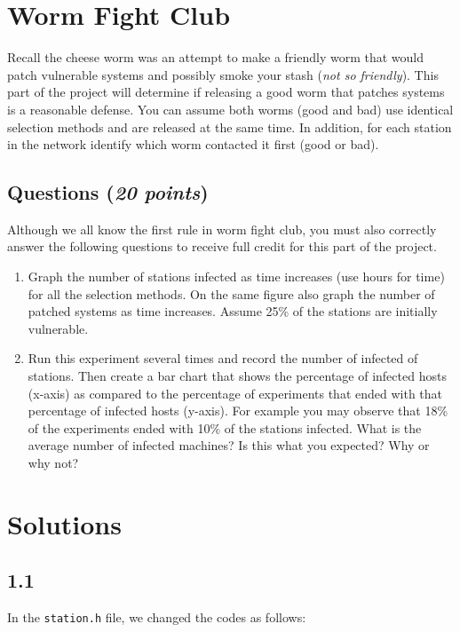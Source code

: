 \documentclass[10pt]{article}
\newcommand{\Section}[1]{
\noindent
\hrulefill
\vspace{-0.15in}
\section{#1}
}
\newcommand{\Questions}[1]{
\subsection*{Questions {\rm \normalsize (\textsf{\textit{#1 points}})}}
}
\begin{document}
\Section{Worm Fight Club}

Recall the cheese worm was an attempt to make a friendly worm that would patch vulnerable systems and possibly smoke your stash (\textit{not so friendly}). This part of the project will determine if releasing a good worm that patches systems is a reasonable defense. You can assume both worms (good and bad) use identical selection methods and are released at the same time. In addition, for each station in the network identify which worm contacted it first (good or bad).

\Questions{20}

Although we all know the first rule in worm fight club, you must also correctly answer the following questions to receive
full credit for this part of the project.

\begin{enumerate}

  \item Graph the number of stations infected as time increases
(use hours for time) for all the selection methods. On the same figure also graph the number of patched systems as time increases. Assume 25\% of the stations are initially vulnerable.

  \item Run this experiment several times and record the number of infected of stations. Then create a bar chart that shows the percentage of infected hosts (x-axis) as compared to the percentage of experiments that ended with that percentage of infected hosts (y-axis). For example you may observe that 18\% of the experiments ended with 10\% of the stations infected. What is the average number of infected machines? Is this what you expected? Why or why not?
\end{enumerate}



\section*{Solutions}
\subsection*{1.1}

In the \texttt{station.h} file, we changed the codes as follows:
\end{document}
